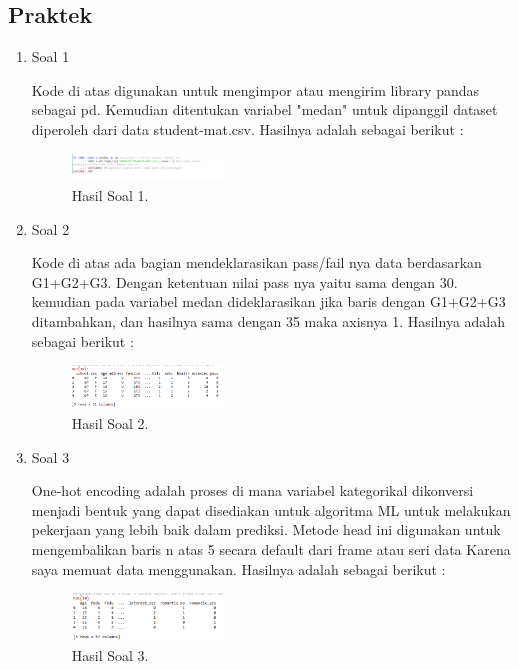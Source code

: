 \subsection{Praktek}
\begin{enumerate}
	\item Soal 1
	\hfill\break
	
	Kode di atas digunakan untuk mengimpor atau mengirim library pandas sebagai pd. Kemudian ditentukan variabel "medan" untuk dipanggil dataset diperoleh dari data student-mat.csv. Hasilnya adalah sebagai berikut :
	\begin{figure}[H]
	\centering
		\includegraphics[width=4cm]{figures/1174095/tugas2/materi/hasil1.PNG}
		\caption{Hasil Soal 1.}
	\end{figure}

	\item Soal 2
	\hfill\break
	
	Kode di atas ada bagian mendeklarasikan pass/fail nya data berdasarkan G1+G2+G3. Dengan ketentuan nilai pass nya yaitu sama dengan 30. kemudian pada variabel medan dideklarasikan jika baris dengan G1+G2+G3 ditambahkan, dan hasilnya sama dengan 35 maka axisnya 1. Hasilnya adalah sebagai berikut :
	\begin{figure}[H]
	\centering
		\includegraphics[width=4cm]{figures/1174095/tugas2/materi/hasil2.PNG}
		\caption{Hasil Soal 2.}
	\end{figure}
	
	\item Soal 3
	\hfill\break
	
	One-hot encoding adalah proses di mana variabel kategorikal dikonversi menjadi bentuk yang dapat disediakan untuk algoritma ML untuk melakukan pekerjaan yang lebih baik dalam prediksi. Metode head ini digunakan untuk mengembalikan baris n atas 5 secara default dari frame atau seri data Karena saya memuat data menggunakan. Hasilnya adalah sebagai berikut :
	\begin{figure}[H]
	\centering
		\includegraphics[width=4cm]{figures/1174095/tugas2/materi/hasil3.PNG}
		\caption{Hasil Soal 3.}
	\end{figure}


\end{enumerate}
